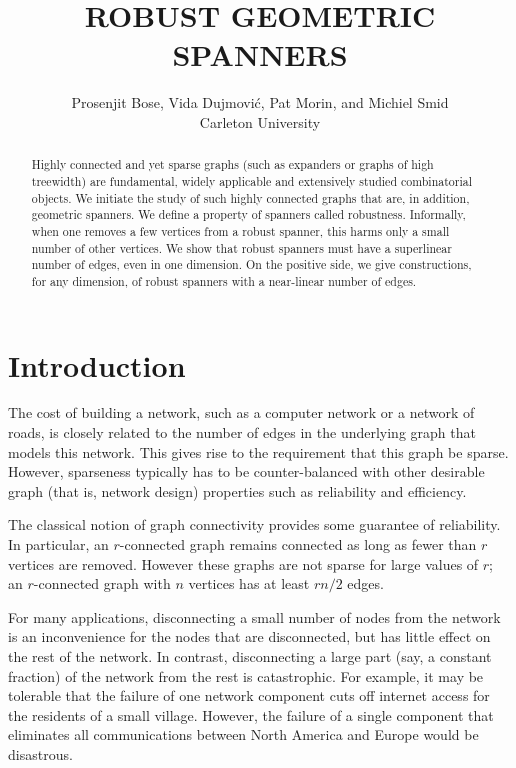 \documentclass{patmorin}
\title{\MakeUppercase{Robust Geometric Spanners}}
\author{Prosenjit Bose, Vida Dujmovi\'c, Pat Morin, and Michiel Smid \\
Carleton University}
\begin{document}
\maketitle

\begin{abstract}
  Highly connected and yet sparse graphs (such as expanders or graphs
  of high treewidth) are fundamental, widely applicable and extensively
  studied combinatorial objects.  We initiate the study of such highly
  connected graphs that are, in addition, geometric spanners.  We define
  a property of spanners called robustness.  Informally, when one removes
  a few vertices from a robust spanner, this harms only a small number of
  other vertices.  We show that robust spanners must have a superlinear
  number of edges, even in one dimension.  On the positive side, we give
  constructions, for any dimension, of robust spanners with a near-linear
  number of edges.
\end{abstract}

\section{Introduction}

The cost of building a network, such as a computer network or a network
of roads, is closely related to the number of edges in the underlying
graph that models this network.  This gives rise to the requirement
that this graph be sparse.  However, sparseness typically has
to be counter-balanced with other desirable graph (that is, network
design) properties such as reliability and efficiency.

The classical notion of graph connectivity provides some guarantee of
reliability. In particular, an $r$-connected graph remains connected as
long as fewer than $r$ vertices are removed. However these graphs are
not sparse for large values of $r$;  an $r$-connected graph with $n$
vertices has at least $rn/2$ edges.

For many applications, disconnecting a small number of nodes from the
network is an inconvenience for the nodes that are disconnected, but has
little effect on the rest of the network.  In contrast, disconnecting
a large part (say, a constant fraction) of the network from the rest
is catastrophic.
For example, it may be tolerable that the failure of one network component
cuts off internet access for the residents of a small village. However,
the failure of a single component that eliminates all communications
between North America and Europe would be disastrous.
\end{document}
